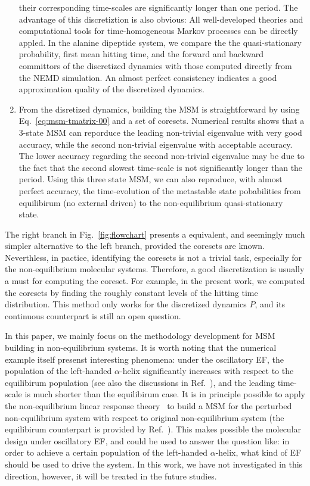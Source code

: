 \documentclass[aps, pre, preprint,unsortedaddress,a4paper,onecolumn]{revtex4}
\begin{document}
\begin{enumerate}
  their corresponding time-scales are significantly longer than one period.
  The advantage of this discretiztion
  is also obvious: All well-developed theories and computational tools
  for time-homogeneous Markov processes
  can be directly appled. In the
  alanine dipeptide system, we compare
  the the quasi-stationary probability,
  first mean hitting time, and the forward and backward committors
  of the discretized dynamics with those computed directly from the
  NEMD simulation. An almost perfect consistency 
  indicates a good approximation quality of the discretized dynamics.
\item From the disretized dynamics, building the MSM is straightforward
  by using Eq.~\eqref{eq:msm-tmatrix-00} and a set of coresets.
  Numerical results shows that a 3-state MSM can reporduce the leading
  non-trivial eigenvalue with very good accuracy, while the second
  non-trivial eigenvalue with acceptable accuracy. The lower accuracy
  regarding the second non-trivial eigenvalue may be due to the fact that
  the second slowest time-scale is not significantly longer than the
  period. Using this three state MSM, we can also reproduce, with
  almost perfect accuracy, the 
  time-evolution of the metastable state
  pobabilities from equilibirum (no external driven)
  to the non-equilibrium quasi-stationary state.
\end{enumerate}

The right branch in Fig.~\ref{fig:flowchart} presents a
equivalent, and seemingly
much simpler alternative to the left branch, provided the
coresets are known. Neverthless, in pactice, identifying
the coresets is not a trivial task, especially for the
non-equilibrium molecular systems.
Therefore, a good discretization is  usually a must for computing the coreset.
For example, in the present work, we computed the coresets by
finding the roughly constant levels of the hitting time distribution.
This method only works for the discretized dynamics $P$, and its continuous
counterpart is still an open question.

In this paper, we mainly focus on the methodology development for MSM
building in non-equilibrium systems. It is worth noting that the
numerical example itself presenst interesting phenomena: under the
oscillatory EF, the population of the left-handed $\alpha$-helix
significantly increases with respect to the equilibirum population
(see also the discussions in Ref.~\cite{wang2014exploring}),
and the leading time-scale is much shorter than the equilibirum case.
It is in principle possible to apply the non-equilibrium
linear response theory~\cite{wang2013linear} to build a MSM for the perturbed
non-equilibrium system with respect to original
non-equilibrium system
(the equilibirum counterpart is provided by Ref.~\cite{schutte2014markov}).
This makes possible the molecular design under
oscillatory EF, and could be used to answer the question like:
in order to achieve a certain population of  the left-handed $\alpha$-helix,
what kind of EF should be used to drive the system.
In this work, we have not investigated in this direction, however, it will
be treated in the future studies.
\end{document}
